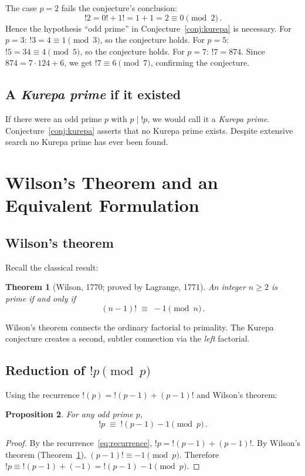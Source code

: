 \documentclass[12pt,a4paper]{amsart}
\newtheorem{theorem}{Theorem}[section]
\newtheorem{proposition}[theorem]{Proposition}
\theoremstyle{definition}
\begin{document}
The case $p = 2$ fails the conjecture's conclusion:
\[
  !2 = 0! + 1! = 1 + 1 = 2 \equiv 0 \pmod{2}\,.
\]
Hence the hypothesis ``odd prime'' in Conjecture~\ref{conj:kurepa} is
necessary.
For $p = 3$: $!3 = 4 \equiv 1 \pmod 3$, so the conjecture holds.
For $p = 5$: $!5 = 34 \equiv 4 \pmod 5$, so the conjecture holds.
For $p = 7$: $!7 = 874$.
Since $874 = 7 \cdot 124 + 6$, we get $!7 \equiv 6 \pmod 7$, confirming the
conjecture.

\subsection{A \textit{Kurepa prime} if it existed}

If there were an odd prime $p$ with $p \mid !p$, we would call it a
\emph{Kurepa prime}.
Conjecture~\ref{conj:kurepa} asserts that no Kurepa prime exists.
Despite extensive search no Kurepa prime has ever been found.

\section{Wilson's Theorem and an Equivalent Formulation}
\label{sec:wilson}

\subsection{Wilson's theorem}

Recall the classical result:

\begin{theorem}[Wilson, 1770; proved by Lagrange, 1771]\label{thm:wilson}
An integer $n \geq 2$ is prime if and only if
\[
  (n-1)! \;\equiv\; -1 \pmod{n}\,.
\]
\end{theorem}

Wilson's theorem connects the ordinary factorial to primality.
The Kurepa conjecture creates a second, subtler connection via the
\emph{left} factorial.

\subsection{Reduction of $!p \pmod{p}$}

Using the recurrence $!(p) = !(p-1) + (p-1)!$ and Wilson's theorem:

\begin{proposition}\label{prop:wilson-reduction}
For any odd prime $p$,
\[
  !p \;\equiv\; !(p-1) - 1 \pmod{p}\,.
\]
\end{proposition}
\begin{proof}
By the recurrence~\eqref{eq:recurrence},
$!p = !(p-1) + (p-1)!$.
By Wilson's theorem (Theorem~\ref{thm:wilson}),
$(p-1)! \equiv -1 \pmod p$.
Therefore $!p \equiv !(p-1) + (-1) = !(p-1) - 1 \pmod p$.
\end{proof}
\end{document}
